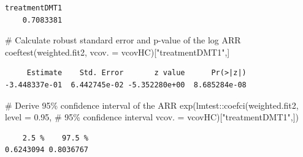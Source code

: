 \documentclass[
  letterpaper,
  DIV=11,
  numbers=noendperiod]{scrreprt}
\newenvironment{Shaded}{\begin{snugshade}}{\end{snugshade}}
\newcommand{\AttributeTok}[1]{\textcolor[rgb]{0.40,0.45,0.13}{#1}}
\newcommand{\CommentTok}[1]{\textcolor[rgb]{0.37,0.37,0.37}{#1}}
\newcommand{\FloatTok}[1]{\textcolor[rgb]{0.68,0.00,0.00}{#1}}
\newcommand{\FunctionTok}[1]{\textcolor[rgb]{0.28,0.35,0.67}{#1}}
\newcommand{\NormalTok}[1]{\textcolor[rgb]{0.00,0.23,0.31}{#1}}
\newcommand{\OtherTok}[1]{\textcolor[rgb]{0.00,0.23,0.31}{#1}}
\newcommand{\SpecialCharTok}[1]{\textcolor[rgb]{0.37,0.37,0.37}{#1}}
\newcommand{\StringTok}[1]{\textcolor[rgb]{0.13,0.47,0.30}{#1}}
\begin{document}
\begin{Shaded}
\end{Shaded}

\begin{verbatim}
treatmentDMT1 
    0.7083381 
\end{verbatim}

\begin{Shaded}
\begin{Highlighting}[]
\CommentTok{\# Calculate robust standard error and p{-}value of the log ARR}
\FunctionTok{coeftest}\NormalTok{(weighted.fit2, }\AttributeTok{vcov. =}\NormalTok{ vcovHC)[}\StringTok{"treatmentDMT1"}\NormalTok{,]}
\end{Highlighting}
\end{Shaded}

\begin{verbatim}
     Estimate    Std. Error       z value      Pr(>|z|) 
-3.448337e-01  6.442745e-02 -5.352280e+00  8.685284e-08 
\end{verbatim}

\begin{Shaded}
\begin{Highlighting}[]
\CommentTok{\# Derive 95\% confidence interval of the ARR}
\FunctionTok{exp}\NormalTok{(lmtest}\SpecialCharTok{::}\FunctionTok{coefci}\NormalTok{(weighted.fit2, }
       \AttributeTok{level =} \FloatTok{0.95}\NormalTok{, }\CommentTok{\# 95\% confidence interval}
       \AttributeTok{vcov. =}\NormalTok{ vcovHC)[}\StringTok{"treatmentDMT1"}\NormalTok{,])}
\end{Highlighting}
\end{Shaded}

\begin{verbatim}
    2.5 %    97.5 % 
0.6243094 0.8036767 
\end{verbatim}
\end{document}
